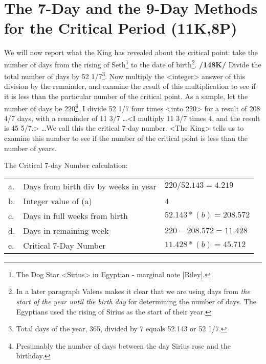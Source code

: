 \section{The 7-Day and the 9-Day Methods for the Critical Period (11K,8P)}

We will now report what the King has revealed about the critical point: take the number of days from the rising of Seth\footnote{The Dog Star <Sirius> in Egyptian - marginal note [Riley].} to the date of birth\footnote{In a later paragraph Valens makes it clear that we are using days from \textsl{the start of the year until the birth day} for determining the number of days. The Egyptians used the rising of Sirius as the start of their year.}. \textbf{/148K/} Divide the total number of days by 52 1/7\footnote{Total days of the year, 365, divided by 7 equals  52.143 or 52 1/7.}. Now multiply the <integer> answer of this division by the remainder, and examine the result of this multiplication to see if it is less than the particular number of the critical point. As a sample, let the number of days be 220\footnote{Presumably the number of days between the day Sirius rose and the birthday.}. I divide 52 1/7 four times <into 220> for a result of 208 4/7 days, with a remainder of 11 3/7 \ldots <I multiply 11 3/7 times 4, and the result is 45 5/7.> \ldots We call this the critical 7-day number.
<The King> tells us to examine this number to see if the number of the critical point is less than the number of years. 

\begin{mdframed}[backgroundcolor=cyan!5]
\tiny
The Critical 7-day Number calculation:
\begin{longtable}[h]{l l l}
a. & Days from birth div by weeks in year &
		$220 / 52.143 = 4.219$		\\
b. & Integer value of (a) & 4 \\		
c. & Days in full weeks from birth & $52.143 * (b) = 208.572$		 \\
d. & Days in remaining week & $220 - 208.572 = 11.428$	\\
e. & Critical 7-Day Number & $11.428 * (b) = 45.712$		\\
\end{longtable}
\end{mdframed}

